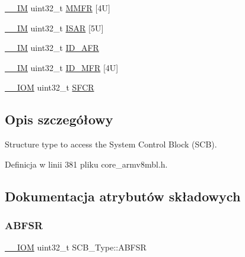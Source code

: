 \begin{DoxyCompactItemize}
\item 
\hyperlink{core__sc300_8h_a4cc1649793116d7c2d8afce7a4ffce43}{\+\_\+\+\_\+\+IM} uint32\+\_\+t \hyperlink{struct_s_c_b___type_a4f353f207bb27a1cea7861aa9eb00dbb}{M\+M\+FR} \mbox{[}4\+U\mbox{]}
\item 
\hyperlink{core__sc300_8h_a4cc1649793116d7c2d8afce7a4ffce43}{\+\_\+\+\_\+\+IM} uint32\+\_\+t \hyperlink{struct_s_c_b___type_a00e93446b3433a807f1574fa2f1fce54}{I\+S\+AR} \mbox{[}5\+U\mbox{]}
\item 
\hyperlink{core__sc300_8h_a4cc1649793116d7c2d8afce7a4ffce43}{\+\_\+\+\_\+\+IM} uint32\+\_\+t \hyperlink{struct_s_c_b___type_a9c9a1d805f8e99b9fd3ab4f455b6333a}{I\+D\+\_\+\+A\+FR}
\item 
\hyperlink{core__sc300_8h_a4cc1649793116d7c2d8afce7a4ffce43}{\+\_\+\+\_\+\+IM} uint32\+\_\+t \hyperlink{struct_s_c_b___type_a781ef24d88610a432e7d5b179d78de47}{I\+D\+\_\+\+M\+FR} \mbox{[}4\+U\mbox{]}
\item 
\hyperlink{core__sc300_8h_ab6caba5853a60a17e8e04499b52bf691}{\+\_\+\+\_\+\+I\+OM} uint32\+\_\+t \hyperlink{struct_s_c_b___type_a82273352d2e8c7a28a7b7cbdfc3d6a75}{S\+F\+CR}
\end{DoxyCompactItemize}


\subsection{Opis szczegółowy}
Structure type to access the System Control Block (S\+CB). 

Definicja w linii 381 pliku core\+\_\+armv8mbl.\+h.



\subsection{Dokumentacja atrybutów składowych}
\mbox{\label{struct_s_c_b___type_a35a95c9a21f43a569a7ac212acb4cee7}} 
\subsubsection{\texorpdfstring{A\+B\+F\+SR}{ABFSR}}
{\footnotesize\ttfamily \hyperlink{core__sc300_8h_ab6caba5853a60a17e8e04499b52bf691}{\+\_\+\+\_\+\+I\+OM} uint32\+\_\+t S\+C\+B\+\_\+\+Type\+::\+A\+B\+F\+SR}

